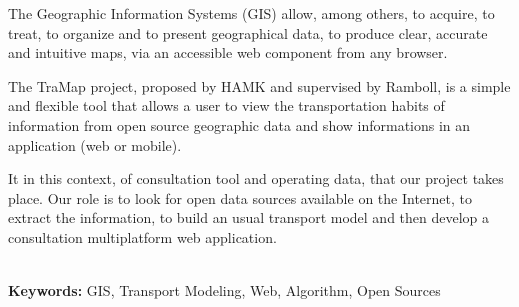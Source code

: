 






The Geographic Information Systems (GIS) allow, among others, to acquire, to treat, to organize and to present geographical data, to produce clear, accurate and intuitive maps, via an accessible web component from any browser.

The TraMap project, proposed by HAMK and supervised by Ramboll, is a simple and flexible tool that allows a user to view the transportation habits of information from open source geographic data and show informations in an application (web or mobile).

It in this context, of consultation tool and operating data, that our project takes place. Our role is to look for open data sources available on the Internet, to extract the information, to build an usual transport model and then develop a consultation multiplatform web application. \\ \\


\par
\smallskip
\noindent \textbf{Keywords:} GIS, Transport Modeling, Web, Algorithm, Open Sources